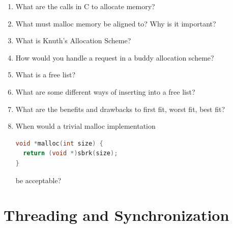 \begin{enumerate}
\item What are the calls in C to allocate memory?
\item What must malloc memory be aligned to? Why is it important?
\item What is Knuth's Allocation Scheme?
\item How would you handle a request in a buddy allocation scheme?
\item What is a free list?
\item What are some different ways of inserting into a free list?
\item What are the benefits and drawbacks to first fit, worst fit, best fit?
\item When would a trivial malloc implementation
\begin{lstlisting}[language=C]
void *malloc(int size) {
  return (void *)sbrk(size);
}
\end{lstlisting}
be acceptable?
\end{enumerate}

\section{Threading and Synchronization}

